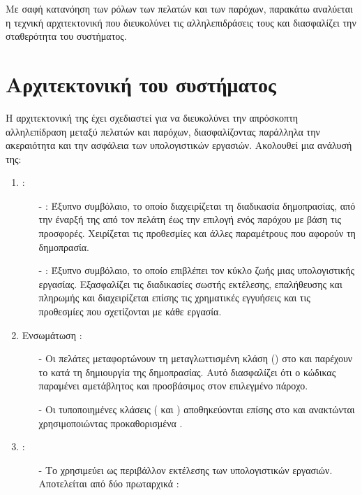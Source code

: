 Με σαφή κατανόηση των ρόλων των πελατών και των παρόχων, παρακάτω αναλύεται η τεχνική αρχιτεκτονική που διευκολύνει τις αλληλεπιδράσεις τους και διασφαλίζει την σταθερότητα του συστήματος.

\section{Αρχιτεκτονική του συστήματος}
Η αρχιτεκτονική της  έχει σχεδιαστεί για να διευκολύνει την απρόσκοπτη αλληλεπίδραση μεταξύ πελατών και παρόχων, διασφαλίζοντας παράλληλα την ακεραιότητα και την ασφάλεια των υπολογιστικών εργασιών. 
Ακολουθεί μια ανάλυσή της:
\begin{enumerate}
    \item {}:
        \begin{itemize}
            \item[-] : Έξυπνο συμβόλαιο, το οποίο διαχειρίζεται τη διαδικασία δημοπρασίας, από την έναρξή της από τον πελάτη έως την επιλογή ενός παρόχου με βάση τις προσφορές. Χειρίζεται τις προθεσμίες και άλλες παραμέτρους που αφορούν τη δημοπρασία.
            \item[-] : Έξυπνο συμβόλαιο, το οποίο επιβλέπει τον κύκλο ζωής μιας υπολογιστικής εργασίας. Εξασφαλίζει τις διαδικασίες σωστής εκτέλεσης, επαλήθευσης και πληρωμής και διαχειρίζεται επίσης τις χρηματικές εγγυήσεις και τις προθεσμίες που σχετίζονται με κάθε εργασία.
        \end{itemize}
    \item Ενσωμάτωση :
        \begin{itemize}
            \item[-] Οι πελάτες μεταφορτώνουν τη μεταγλωττισμένη κλάση  () στο  και παρέχουν το  κατά τη δημιουργία της δημοπρασίας. Αυτό διασφαλίζει ότι ο κώδικας παραμένει αμετάβλητος και προσβάσιμος στον επιλεγμένο πάροχο. 
            \item[-] Οι τυποποιημένες  κλάσεις ( και ) αποθηκεύονται επίσης στο  και ανακτώνται χρησιμοποιώντας προκαθορισμένα . 
        \end{itemize}
    \item {}: 
    \begin{itemize} 
        \item[-] Το  χρησιμεύει ως περιβάλλον εκτέλεσης των υπολογιστικών εργασιών. Αποτελείται από δύο πρωταρχικά :

\end{itemize}
\end{enumerate}

